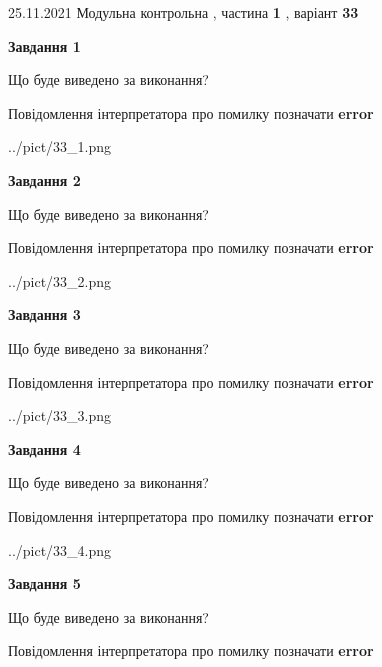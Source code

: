 \documentclass[10pt, ukrainian]{article}
\begin{document}
{25.11.2021 Модульна контрольна , частина \textbf { 1 }, варіант  \No \textbf { 33 }\par}
{
\begin {large}

{\begin {center}\textbf{Завдання 1}\end {center}}\par
Що буде виведено за виконання? \par
Повідомлення інтерпретатора про помилку позначати \textbf{error}

\begin{center}
	{../pict/33_1.png}
\end{center}
\newpage

{\begin {center}\textbf{Завдання 2}\end {center}}\par
Що буде виведено за виконання? \par
Повідомлення інтерпретатора про помилку позначати \textbf{error}

\begin{center}
	{../pict/33_2.png}
\end{center}
\newpage

{\begin {center}\textbf{Завдання 3}\end {center}}\par
Що буде виведено за виконання? \par
Повідомлення інтерпретатора про помилку позначати \textbf{error}

\begin{center}
	{../pict/33_3.png}
\end{center}
\newpage

{\begin {center}\textbf{Завдання 4}\end {center}}\par
Що буде виведено за виконання? \par
Повідомлення інтерпретатора про помилку позначати \textbf{error}

\begin{center}
	{../pict/33_4.png}
\end{center}
\newpage

{\begin {center}\textbf{Завдання 5}\end {center}}\par
Що буде виведено за виконання? \par
Повідомлення інтерпретатора про помилку позначати \textbf{error}


\end{large}}
\end{document}
